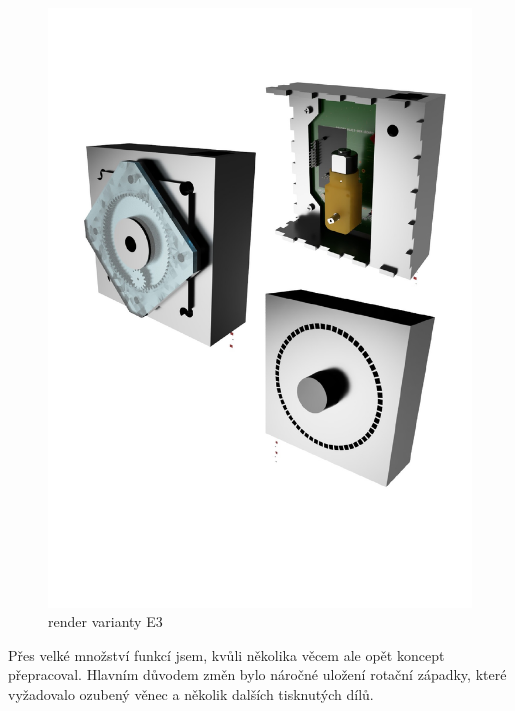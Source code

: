 \begin{figure}[htbp]
    \centering
    \includegraphics[width=\textwidth]{kapitoly/obrazky/E3/rendery.pdf}
    \caption{render varianty E3}
    \label{fig:E3-renderi}
\end{figure}

Přes velké množství funkcí jsem, kvůli několika věcem ale opět koncept přepracoval. Hlavním důvodem změn bylo náročné uložení rotační západky, 
které vyžadovalo ozubený věnec a několik dalších tisknutých dílů.

\newpage